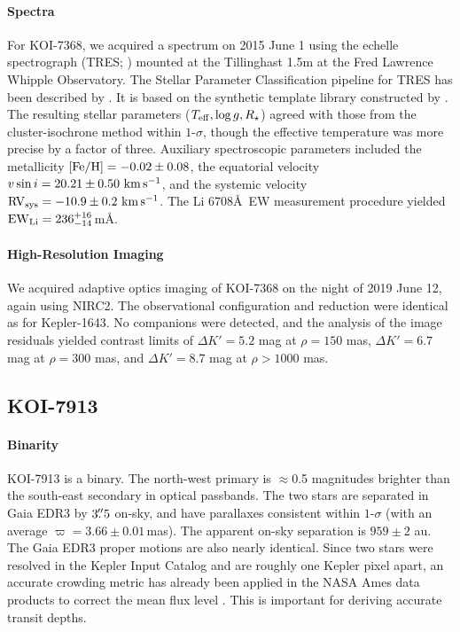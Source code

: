 \documentclass[12pt,twocolumn]{aastex63}
\newcommand{\mkms}{{\rm \,km\,s^{-1}}}  %
\begin{document}
\paragraph{Spectra}
For KOI-7368, we acquired a spectrum on 2015 June 1 using the echelle
spectrograph (TRES; \citealt{furesz_tres_2008}) mounted at the
Tillinghast 1.5m at the Fred Lawrence Whipple Observatory.  The
Stellar Parameter Classification pipeline for TRES has been described
by \citet{2021tsc2.confE.124B}.  It is based on the synthetic template
library constructed by \citet{Buchhave2012}.  The resulting stellar
parameters ($T_{\rm eff}, \log g, R_\star$) agreed with those from the
cluster-isochrone method within $1$-$\sigma$, though the effective
temperature was more precise by a factor of three.  Auxiliary
spectroscopic parameters included the metallicity $[{\rm Fe/H}]= -0.02
\pm 0.08$, the equatorial velocity $v\sin i = 20.21 \pm 0.50\,\mkms$,
and the systemic velocity ${\rm RV}_{\rm sys} = -10.9 \pm 0.2\,\mkms$.
The Li 6708\AA\ EW measurement procedure yielded ${\rm EW}_{\rm Li} =
236^{+16}_{-14}$\,m\AA.

\paragraph{High-Resolution Imaging}
We acquired adaptive optics imaging of KOI-7368 on the night of 2019
June 12, again using NIRC2.  The observational configuration and
reduction were identical as for Kepler-1643.  No companions were
detected, and the analysis of the image residuals yielded contrast
limits of $\Delta K' = 5.2$ mag at $\rho = 150$ mas, $\Delta K' = 6.7$
mag at $\rho = 300$ mas, and $\Delta K' = 8.7$ mag at $\rho > 1000$
mas.

\subsection{KOI-7913}

\paragraph{Binarity}
KOI-7913 is a binary.  The north-west primary is
$\approx$0.5 magnitudes brighter than the south-east secondary in
optical passbands.  The two stars are separated in Gaia EDR3 by
$3\mbox{$.\!\!^{\prime\prime}$}5$ on-sky, and have parallaxes consistent within $1$-$\sigma$
(with an average $\varpi=3.66 \pm 0.01$\,mas).  The apparent on-sky
separation is $959 \pm 2$ au.  The Gaia EDR3 proper motions are also
nearly identical.  Since two stars were resolved in the Kepler Input
Catalog and are roughly one Kepler pixel apart, an accurate crowding
metric has already been applied in the NASA Ames data products to
correct the mean flux level \citep{2017ksci.rept....6M}.  This is
important for deriving accurate transit depths.
\end{document}

